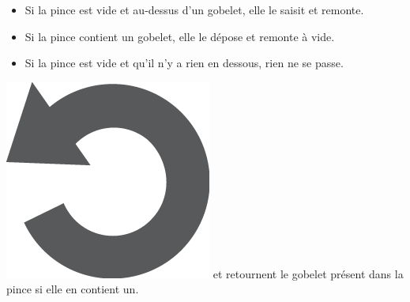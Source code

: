 \documentclass[a4paper]{article}
\begin{document}
\begin{minipage}{6cm}
\begin{itemize}[leftmargin=5mm]
\item Si la pince est vide et au-dessus d'un gobelet, elle
  le saisit et remonte.
\item Si la pince contient un gobelet, elle le d\'epose et remonte
  \`a vide.
\item Si la pince est vide et qu'il n'y a rien en dessous, rien ne se passe.
\end{itemize}


\includegraphics[height=\baselineskip]{rewind} et 
 retournent le gobelet présent dans la pince si elle en contient un.
\end{minipage}
\hfill
%
%
\end{document}
